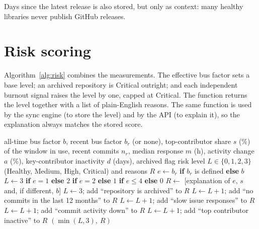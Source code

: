 \documentclass[11pt,a4paper]{report}
\begin{document}
Days since the latest release is also stored, but only as context: many
healthy libraries never publish GitHub releases.

\section{Risk scoring}

Algorithm~\ref{alg:risk} combines the measurements. The effective bus factor
sets a base level; an archived repository is Critical outright; and each
independent burnout signal raises the level by one, capped at Critical. The
function returns the level together with a list of plain-English reasons. The
same function is used by the sync engine (to store the level) and by the API
(to explain it), so the explanation always matches the stored score.

\begin{algorithm}[H]
\caption{Risk assessment (\texttt{assess\_risk})}
\label{alg:risk}
\begin{algorithmic}[1]
\Require all-time bus factor $b$, recent bus factor $b_r$ (or none), top-contributor share $s$ (\%)
         of the window in use, recent commits $n_r$, median response $m$ (h),
         activity change $a$ (\%), key-contributor inactivity $d$ (days), archived flag
\Ensure risk level $L \in \{0, 1, 2, 3\}$ (Healthy, Medium, High, Critical) and reasons $R$
\State $e \gets b_r$ \textbf{if} $b_r$ is defined \textbf{else} $b$
\State $L \gets 3$ \textbf{if} $e = 1$ \textbf{else} $2$ \textbf{if} $e = 2$
       \textbf{else} $1$ \textbf{if} $e \le 4$ \textbf{else} $0$
\State $R \gets$ [explanation of $e$, $s$ and, if different, $b$]
 \State $L \gets 3$; add ``repository is archived'' to $R$ \EndIf
{} \State $L \gets L + 1$; add ``no commits in the last 12 months'' to $R$ \EndIf
{} \State $L \gets L + 1$; add ``slow issue responses'' to $R$ \EndIf
{} \State $L \gets L + 1$; add ``commit activity down'' to $R$ \EndIf
{}
  \State $L \gets L + 1$; add ``top contributor inactive'' to $R$
\EndIf
\State \Return $(\min(L, 3),\ R)$
\end{algorithmic}
\end{algorithm}
\end{document}
